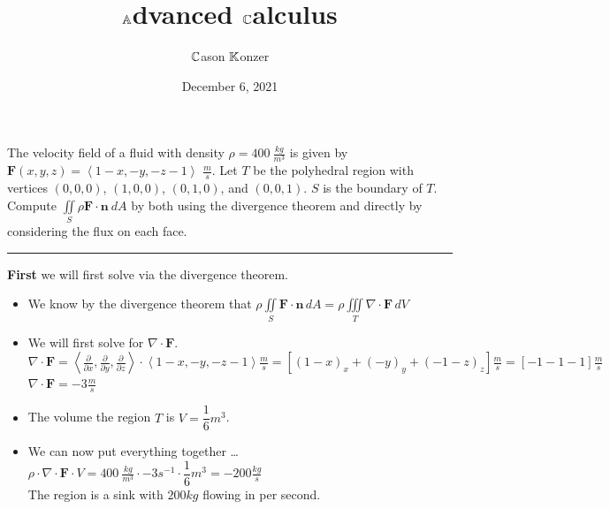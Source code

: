 \documentclass[10pt]{article}
\title{$\mathbb{A}$dvanced $\mathbb{C}$alculus}
\author{$\mathbb{C}$ason $\mathbb{K}$onzer}
\date{December 6, 2021}
\begin{document}
\maketitle

\newpage


\section{\underline{}}
\label{sec: Problem 1}

\noindent
The velocity field of a fluid with density $ \rho = 400\ \tfrac{kg}{m^3} $
is given by $ \textbf{F}(x,y,z) = \left<1-x,-y,-z-1\right> $ $ \tfrac{m}{s} $.
Let $ T $ be the polyhedral region with vertices
$ (0,0,0) $, $ (1,0,0) $, $ (0,1,0) $, and $ (0,0,1) $.  $ S $ is the boundary of $ T $. \\
Compute $ \displaystyle \iint \limits_{S} \rho \textbf{F} \cdot \textbf{n}\ dA $
by both using the divergence theorem and directly by considering the flux on each face. \\
\vspace{2.5mm}

\hrule

\vspace{7.5mm}

\noindent
\textbf{First} we will first solve via the divergence theorem. \\

\begin{itemize}
    \item We know by the divergence theorem that
    $ \displaystyle \rho \iint \limits_{S} \textbf{F} \cdot \textbf{n} \, dA = \rho \iiint \limits_{T} \nabla \cdot \textbf{F} \, dV $ \\
    \item We will first solve for $ \nabla \cdot \textbf{F} $. \\
    \subitem $ \displaystyle \nabla \cdot \textbf{F} = \left<\frac{\partial}{\partial x},\frac{\partial}{\partial y},\frac{\partial}{\partial z}\right> \cdot \left<1-x,-y,-z-1\right> \tfrac{m}{s}= [(1-x)_{x} + (-y)_{y} + (-1-z)_{z}] \tfrac{m}{s} = [-1 -1 -1] \tfrac{m}{s} $ \\
    \subitem $ \displaystyle \nabla \cdot \textbf{F} = -3 \tfrac{m}{s} $ \\
    \item The volume the region $ T $ is $ \displaystyle V = \dfrac{1}{6}m^3 $. \\
    \item We can now put everything together \dots \\
    \subitem $ \displaystyle \rho \cdot \nabla \cdot \textbf{F} \cdot V = 400\ \tfrac{kg}{m^3} \cdot - 3s^{-1} \cdot \dfrac{1}{6}m^3 = -200\tfrac{kg}{s}  $ \\
    \subitem The region is a sink with $ 200kg $ flowing in per second.
\end{itemize}
\end{document}

